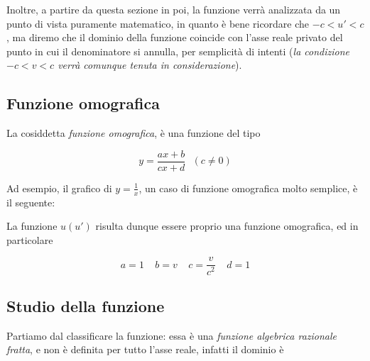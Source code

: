 \documentclass{article}
\begin{document}
Inoltre, a partire da questa sezione in poi, la funzione
verrà analizzata da un punto di vista puramente matematico,
in quanto è bene ricordare che \(-c < u' < c\), ma diremo
che il dominio della funzione coincide con l'asse reale
privato del punto in cui il denominatore si annulla,
per semplicità di intenti (\textit{la condizione
\(-c < v < c\) verrà comunque tenuta in considerazione}).

\subsection{Funzione omografica}
La cosiddetta \textit{funzione omografica}, è una funzione del tipo

\begin{equation}
    y = \frac{ax + b}{cx + d}\ \ \ (c \neq 0)
\end{equation}

Ad esempio, il grafico di \(y = \frac{1}{x}\), un caso di funzione
omografica molto semplice, è il seguente:

\begin{center}
\end{center}

La funzione \(u(u')\) risulta dunque essere proprio una
funzione omografica, ed in particolare

\begin{equation}
    a = 1\ \ \ \ \ b = v\ \ \ \ \ c = \frac{v}{c^2}\ \ \ \ \ d = 1
\end{equation}

\subsection{Studio della funzione}
Partiamo dal classificare la funzione: essa è una \textit{funzione
algebrica razionale fratta}, e non è definita per tutto l'asse reale,
infatti il dominio è
\end{document}
